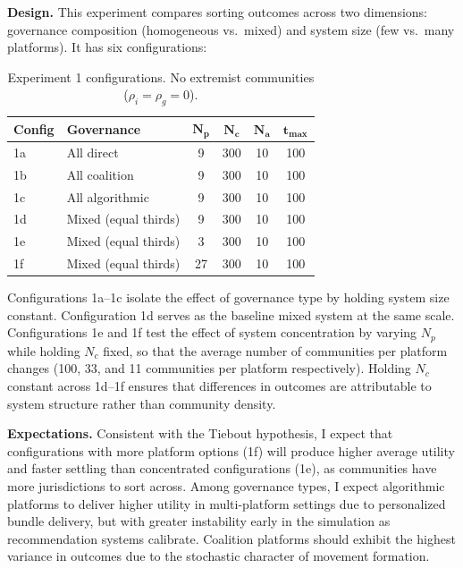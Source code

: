 \documentclass[12pt]{article}
\begin{document}
\textbf{Design.} This experiment compares sorting outcomes across two dimensions: governance composition (homogeneous vs.\ mixed) and system size (few vs.\ many platforms). It has six configurations:

\begin{table}[h]
\centering
\begin{tabular}{llcccc}
\hline
\textbf{Config} & \textbf{Governance} & $\mathbf{N_p}$ & $\mathbf{N_c}$ & $\mathbf{N_a}$ & $\mathbf{t_{max}}$ \\
\hline \hline
1a & All direct & 9 & 300 & 10 & 100 \\
1b & All coalition & 9 & 300 & 10 & 100 \\
1c & All algorithmic & 9 & 300 & 10 & 100 \\
1d & Mixed (equal thirds) & 9 & 300 & 10 & 100 \\
1e & Mixed (equal thirds) & 3 & 300 & 10 & 100 \\
1f & Mixed (equal thirds) & 27 & 300 & 10 & 100 \\
\hline
\end{tabular}
\caption{Experiment 1 configurations. No extremist communities ($\rho_i = \rho_g = 0$).}
\label{tab:exp1_config}
\end{table}

Configurations 1a--1c isolate the effect of governance type by holding system size constant. Configuration 1d serves as the baseline mixed system at the same scale. Configurations 1e and 1f test the effect of system concentration by varying $N_p$ while holding $N_c$ fixed, so that the average number of communities per platform changes (100, 33, and 11 communities per platform respectively). Holding $N_c$ constant across 1d--1f ensures that differences in outcomes are attributable to system structure rather than community density.

\textbf{Expectations.} Consistent with the Tiebout hypothesis, I expect that configurations with more platform options (1f) will produce higher average utility and faster settling than concentrated configurations (1e), as communities have more jurisdictions to sort across. Among governance types, I expect algorithmic platforms to deliver higher utility in multi-platform settings due to personalized bundle delivery, but with greater instability early in the simulation as recommendation systems calibrate. Coalition platforms should exhibit the highest variance in outcomes due to the stochastic character of movement formation.

\end{document}
